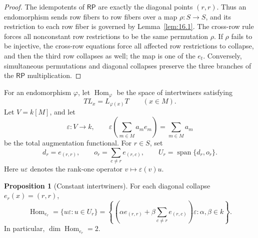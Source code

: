 \documentclass[11pt]{article}
\theoremstyle{definition}
\newtheorem{proposition}[theorem]{Proposition}
\newcommand{\RP}{\mathsf{RP}}
\begin{document}
\begin{proof}
The idempotents of \(\RP\) are exactly the diagonal points \((r,r)\).  Thus
an endomorphism sends row fibers to row fibers over a map \(\rho:S\to S\),
and its restriction to each row fiber is governed by Lemma~\ref{lem:16.1}.
The cross-row rule forces all nonconstant row restrictions to be the same
permutation \(\rho\).  If \(\rho\) fails to be injective, the cross-row
equations force all affected row restrictions to collapse, and then the third
row collapses as well; the map is one of the \(e_t\).  Conversely,
simultaneous permutations and diagonal collapses preserve the three branches
of the \(\RP\) multiplication.
\end{proof}

For an endomorphism \(\varphi\), let \(\operatorname{Hom}_\varphi\) be the
space of intertwiners satisfying
\[
T L_x=L_{\varphi(x)}T
\qquad(x\in M).
\]
Let \(V=k[M]\), and let
\[
\varepsilon:V\to k,
\qquad
\varepsilon\!\left(\sum_{m\in M}a_m e_m\right)=\sum_{m\in M}a_m
\]
be the total augmentation functional.  For \(r\in S\), set
\[
d_r=e_{(r,r)},
\qquad
o_r=\sum_{c\ne r}e_{(r,c)},
\qquad
U_r=\operatorname{span}\{d_r,o_r\}.
\]
Here \(u\varepsilon\) denotes the rank-one operator
\(v\mapsto \varepsilon(v)u\).

\begin{proposition}[Constant intertwiners]
\label{prop:constant-intertwiners}
For each diagonal collapse \(e_r(x)=(r,r)\),
\[
\operatorname{Hom}_{e_r}
=
\{u\varepsilon:u\in U_r\}
=
\left\{
\left(\alpha e_{(r,r)}+\beta\sum_{c\ne r}e_{(r,c)}\right)\varepsilon:
\alpha,\beta\in k
\right\}.
\]
In particular, \(\dim\operatorname{Hom}_{e_r}=2\).
\end{proposition}
\end{document}
